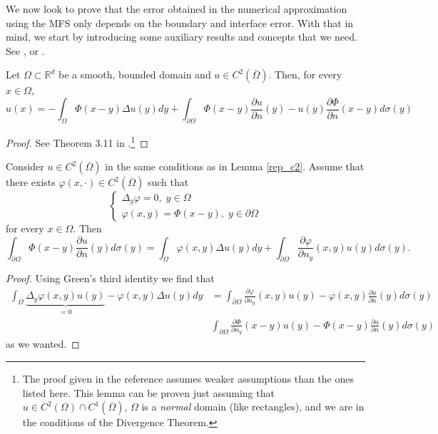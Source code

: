 We now look to prove that the error obtained in the numerical approximation using the MFS only depends on the boundary and interface error. With that in mind, we start by introducing some auxiliary results and concepts that we need. See \cite{salsa2016partial}, \cite{evans2022partial} or \cite{huguinho}.
\begin{lemma}\label{rep_c2}
    Let \(\Omega \subset \mathbb{R}^d\) be a smooth, bounded domain and \(u \in C^2(\overline{\Omega})\). Then, for every \(x \in \Omega\),
    \[
    u(x) = -\int_\Omega \Phi(x-y)\Delta u(y) dy + \int_{\partial \Omega} \Phi(x-y)\frac{\partial u}{\partial n}(y) - u(y) \frac{\partial \Phi}{\partial n}(x-y) d\sigma(y)
    \]
\end{lemma}
\begin{proof}
    See Theorem 3.11 in \cite{sauvigny2012partial}.\footnote{The proof given in the reference assumes weaker assumptions than the ones listed here. This lemma can be proven just assuming that \(u \in C^2(\Omega)\cap C^1(\overline{\Omega})\), \(\Omega\) is a \textit{normal} domain (like rectangles), and we are in the conditions of the Divergence Theorem.}
\end{proof}
\begin{lemma}\label{phi}
    Consider \(u \in C^2(\overline{\Omega})\) in the same conditions as in Lemma \ref{rep_c2}. Assume that there exists \(\varphi(x, \cdot) \in C^2(\overline{\Omega})\) such that
    \[
    \begin{cases}
        \Delta_y \varphi = 0, \; y \in \Omega\\
        \varphi(x, y) = \Phi(x-y), \; y \in \partial \Omega 
    \end{cases}    
    \]
    for every \(x \in \Omega\). Then 
    \[
    \int_{\partial\Omega} \Phi(x-y)\frac{\partial u}{\partial n}(y) d\sigma(y) = \int_\Omega \varphi(x, y)\Delta u(y) dy  + \int_{\partial\Omega} \frac{\partial \varphi}{\partial n_y}(x,y) u(y) d\sigma(y).
    \]
\end{lemma}
\begin{proof}
    Using Green's third identity we find that
    \begin{align*}
    \int_\Omega \underbrace{\Delta_y \varphi(x, y) u(y)}_{=0} - \varphi(x, y)\Delta u(y)dy &= \int_{\partial\Omega} \frac{\partial \varphi}{\partial n_y}(x,y) u(y) - \varphi(x, y)\frac{\partial u}{\partial n}(y)  d\sigma(y)\\
    &\int_{\partial\Omega} \frac{\partial \Phi}{\partial n_y}(x-y) u(y) - \Phi(x-y)\frac{\partial u}{\partial n}(y)  d\sigma(y)
\end{align*}
as we wanted.
\end{proof}

